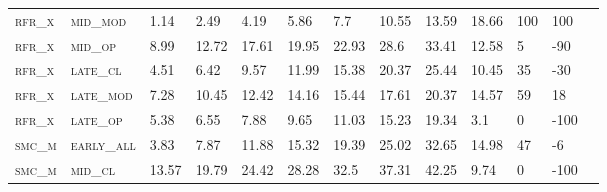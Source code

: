 \begin{landscape}
\begin{table}[!htbp]
\begin{tabular}{@{}lllllllllllll@{}}
\footnotesize \textsc{rfr\_x}      & \footnotesize \textsc{mid\_mod  }               & \footnotesize 1.14            & \footnotesize 2.49            & \footnotesize 4.19             & \footnotesize 5.86             & \footnotesize 7.7              & \footnotesize 10.55            & \footnotesize 13.59       & \footnotesize 18.66    & \footnotesize 100    & \footnotesize 100      \\
\footnotesize \textsc{rfr\_x}      & \footnotesize \textsc{mid\_op   }               & \footnotesize 8.99            & \footnotesize 12.72           & \footnotesize 17.61            & \footnotesize 19.95            & \footnotesize 22.93            & \footnotesize 28.6             & \footnotesize 33.41       & \footnotesize 12.58    & \footnotesize 5      & \footnotesize -90      \\
\footnotesize \textsc{rfr\_x}      & \footnotesize \textsc{late\_cl  }               & \footnotesize 4.51            & \footnotesize 6.42            & \footnotesize 9.57             & \footnotesize 11.99            & \footnotesize 15.38            & \footnotesize 20.37            & \footnotesize 25.44       & \footnotesize 10.45    & \footnotesize 35     & \footnotesize -30      \\
\footnotesize \textsc{rfr\_x}      & \footnotesize \textsc{late\_mod }               & \footnotesize 7.28            & \footnotesize 10.45           & \footnotesize 12.42            & \footnotesize 14.16            & \footnotesize 15.44            & \footnotesize 17.61            & \footnotesize 20.37       & \footnotesize 14.57    & \footnotesize 59     & \footnotesize 18       \\
\footnotesize \textsc{rfr\_x}      & \footnotesize \textsc{late\_op  }               & \footnotesize 5.38            & \footnotesize 6.55            & \footnotesize 7.88             & \footnotesize 9.65             & \footnotesize 11.03            & \footnotesize 15.23            & \footnotesize 19.34       & \footnotesize 3.1      & \footnotesize 0      & \footnotesize -100     \\
\footnotesize \textsc{smc\_m}      & \footnotesize \textsc{early\_all}               & \footnotesize 3.83            & \footnotesize 7.87            & \footnotesize 11.88            & \footnotesize 15.32            & \footnotesize 19.39            & \footnotesize 25.02            & \footnotesize 32.65       & \footnotesize 14.98    & \footnotesize 47     & \footnotesize -6       \\
\footnotesize \textsc{smc\_m}      & \footnotesize \textsc{mid\_cl   }               & \footnotesize 13.57           & \footnotesize 19.79           & \footnotesize 24.42            & \footnotesize 28.28            & \footnotesize 32.5             & \footnotesize 37.31            & \footnotesize 42.25       & \footnotesize 9.74     & \footnotesize 0      & \footnotesize -100     \\

\end{tabular}
\end{table}
\end{landscape}
